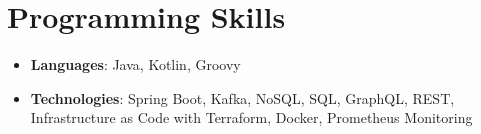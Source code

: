 \documentclass[letterpaper,11pt]{article}
\newcommand{\resumeSubHeadingListStart}{\begin{itemize}[leftmargin=*]}
\newcommand{\resumeSubHeadingListEnd}{\end{itemize}}
\begin{document}
\section{Programming Skills}
  \resumeSubHeadingListStart
    \item{
      \textbf{Languages}{: Java, Kotlin, Groovy}
      \hfill
    }
	\item{
	  \textbf{Technologies}{: Spring Boot, Kafka, NoSQL, SQL, GraphQL, REST, Infrastructure as Code with Terraform, Docker, Prometheus Monitoring}
	  \hfill
	}
  \resumeSubHeadingListEnd


\end{document}
